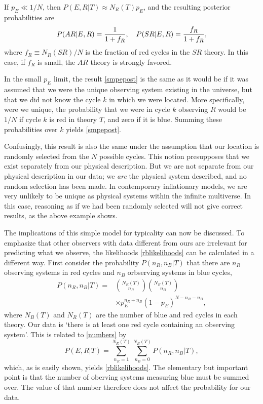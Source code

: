 \documentclass[pra,floatfix,preprint,nofootinbib,12pt]{revtex4}
\begin{document}
If $p_E \ll 1/N$, then $P(E,R|T) \approx N_R(T) p_E$, and the resulting posterior probabilities are 
\begin{equation}
P(AR|E,R) = {1\over 1 + f_R},  \quad P(SR|E,R) = {f_R\over 1 + f_R},
\label{smpepost}
\end{equation}
where $f_R \equiv N_R(SR)/N$ is the fraction of red cycles in the $SR$ theory.  In this case,
if $f_R$ is small, the $AR$ theory is strongly favored.

In the small $p_E$ limit, the result \eqref{smpepost} is the same as it would be if it was assumed that we were the unique observing system existing in the universe, but that we did not know the cycle $k$ in which we were located.  More specifically,  were  we unique, the probability 
that we were in cycle $k$ observing $R$ would be $1/N$
if cycle $k$ is red in theory $T$, and zero if it is blue. Summing these probabilities 
over $k$ yields \eqref{smpepost}.

Confusingly, this result is also the same under the assumption that our location is randomly selected from the $N$ possible cycles.  This notion presupposes that we exist separately from our physical description.  But  we are not separate from our physical description in our data; 
we {\it are} the physical system described, and no random selection has been made.
In contemporary inflationary models, we are very unlikely to be unique as physical systems within the infinite multiverse.  In this case, reasoning as if we had been randomly selected will not give correct results, as the above example shows.  

The implications of this simple model for typicality can now be discussed.  To emphasize that other observers with data different from ours are irrelevant for predicting what we observe, the likelihoods \eqref{rblikelihoods} can be calculated in a different way.  First consider the probability $P(n_R,n_B|T)$  that there are $n_R$ observing systems in red cycles and $n_B$ orbserving systems in blue cycles,
\begin{align}
P(n_R,n_B|T) = &{N_R(T) \choose n_R}{N_B(T) \choose n_B} \nonumber \\
&\times p_E^{n_R+n_B} (1-p_{E})^{N-n_R-n_B},
\label{numbers}
\end{align}
where $N_B(T)$ and $N_R(T)$ are the number of blue and red cycles in each theory. 
Our data is `there is at least one red cycle containing an observing system'. This is related to \eqref{numbers} by 
\begin{equation}
P(E,R|T) = \sum\limits_{n_R=1}^{N_R(T)}\sum\limits_{n_B=0}^{N_B(T)}P(n_R,n_B|T),
\label{sumoverblue}
\end{equation}
which, as is easily shown, yields \eqref{rblikelihoods}. The elementary but important point is that the number of oberving systems measuring blue must be summed over. The value of that number therefore does not affect the probability for our data. 
\end{document}
